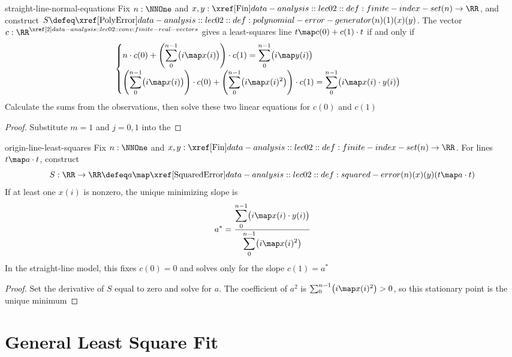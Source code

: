 \documentclass[12pt]{article}
\numberwithin{figure}{section}
\begin{document}
\begin{cor}{straight-line-normal-equations}
    Fix $n:\NNOne$ and $x,y:\Fin(n)\to\RR$, and construct
    $S\defeq\PolyError(n)(1)(x)(y)$. The vector $c:\RealVectors{2}$
    gives a least-squares line $t\map c(0)+c(1)\cdot t$ if and only if
    \[
      \begin{cases}
        n\cdot c(0)
          +\left(\displaystyle\sum_0^{n-1}\bigl(i\map x(i)\bigr)\right)
            \cdot c(1)
          =\displaystyle\sum_0^{n-1}\bigl(i\map y(i)\bigr)\\[1em]
        \left(\displaystyle\sum_0^{n-1}\bigl(i\map x(i)\bigr)\right)
          \cdot c(0)
          +\left(\displaystyle\sum_0^{n-1}\bigl(i\map x(i)^2\bigr)\right)
            \cdot c(1)
          =\displaystyle\sum_0^{n-1}\bigl(i\map x(i)\cdot y(i)\bigr)
      \end{cases}
    \]
    Calculate the sums from the observations, then solve these two linear
    equations for $c(0)$ and $c(1)$
\end{cor}

\begin{proof}
    Substitute $m=1$ and $j=0,1$ into the
\end{proof}

\begin{cor}{origin-line-least-squares}
    Fix $n:\NNOne$ and $x,y:\Fin(n)\to\RR$. For lines $t\map a\cdot t$,
    construct
    \[
      S:\RR\to\RR
        \defeq a\map\SquaredError(n)(x)(y)(t\map a\cdot t)
    \]
    If at least one $x(i)$ is nonzero, the unique minimizing slope is
    \[
      a^*=\frac{\displaystyle\sum_0^{n-1}\bigl(i\map x(i)\cdot y(i)\bigr)}
        {\displaystyle\sum_0^{n-1}\bigl(i\map x(i)^2\bigr)}
    \]
    In the straight-line model, this fixes $c(0)=0$ and solves only for
    the slope $c(1)=a^*$
\end{cor}

\begin{proof}
    Set the derivative of $S$ equal to zero and solve for $a$.
    The coefficient of $a^2$ is
    $\sum_0^{n-1}\bigl(i\map x(i)^2\bigr)>0$, so this stationary point
    is the unique minimum
\end{proof}


\section{General Least Square Fit}
\end{document}
